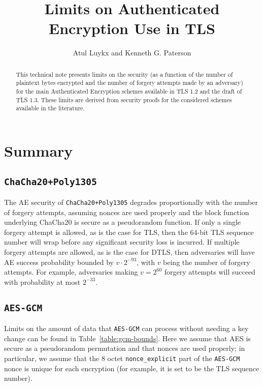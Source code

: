 \documentclass{article}
\title{Limits on Authenticated Encryption Use in TLS}
\author{Atul Luykx and Kenneth G. Paterson}
\begin{document}
\maketitle


\begin{abstract}
This technical note presents limits on the security (as a function of the number of plaintext bytes encrypted and the number of forgery attempts made by an adversary) for the main Authenticated Encryption schemes available in TLS 1.2 and the draft of TLS 1.3. These limits are derived from security proofs for the considered schemes available in the literature. 
\end{abstract}


\section{Summary}

\subsection{\texttt{ChaCha20+Poly1305}}
The AE security of \texttt{ChaCha20+Poly1305} degrades proportionally with the number of forgery attempts, assuming nonces are used properly and the block function underlying ChaCha20 is secure as a pseudorandom function. If only a single forgery attempt is allowed, as is the case for TLS, then the 64-bit TLS sequence number will wrap before any significant security loss is incurred. If multiple forgery attempts are allowed, as is the case for DTLS, then adversaries will have AE success probability bounded by $v\cdot 2^{-93}$, with $v$ being the number of forgery attempts. For example, adversaries making $v = 2^{60}$ forgery attempts will succeed with probability at most $2^{-33}$.

\subsection{ \texttt{AES-GCM} }

Limits on the amount of data that \texttt{AES-GCM} can process without needing a key change can be found in Table~\ref{table:gcm-bounds}. Here we  assume that AES is secure as a pseudorandom permutation and that nonces are used properly; in particular, we assume that the 8 octet \verb|nonce_explicit| part of the \texttt{AES-GCM} nonce is unique for each encryption (for example, it is set to be the TLS sequence number). 
\end{document}
